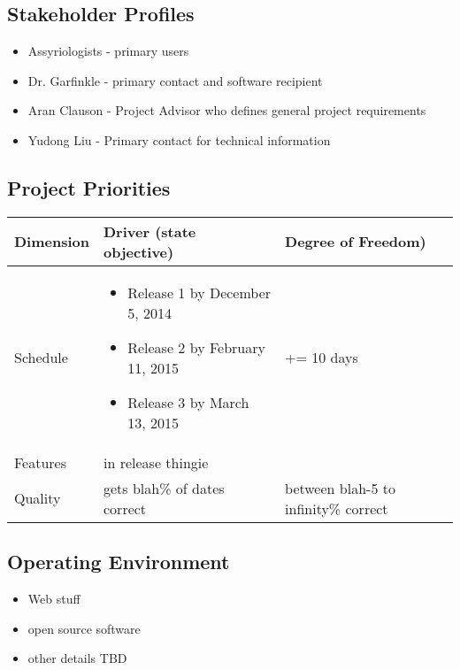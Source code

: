 \documentclass[11pt]{article}
\begin{document}
\subsection{Stakeholder Profiles}
\begin{itemize}
    \item Assyriologists - primary users
    \item Dr. Garfinkle - primary contact and software recipient
    \item Aran Clauson - Project Advisor who defines general project requirements
    \item Yudong Liu - Primary contact for technical information
\end{itemize}

\subsection{Project Priorities}
\begin{tabularx}{\textwidth}{|l|X|l|}
    \hline
    \textbf{Dimension} & \textbf{Driver (state objective)} & \textbf{Degree of Freedom)} \\
    \hline
    Schedule &
        \begin{itemize}
            \item Release 1 by December 5, 2014 
            \item Release 2 by February 11, 2015
            \item Release 3 by March 13, 2015
        \end{itemize}
    & += 10 days \\
    \hline
    Features & in release thingie & \\
    \hline
    Quality & gets blah\% of dates correct & between blah-5 to infinity\% correct \\
    \hline
\end{tabularx}

\subsection{Operating Environment}
\begin{itemize}
    \item Web stuff
    \item open source software
    \item other details TBD
\end{itemize}
\end{document}
